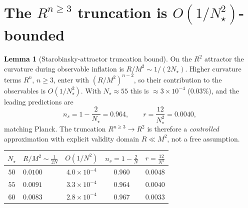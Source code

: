 \documentclass[11pt,a4paper]{article}
\theoremstyle{definition}
\newtheorem{lemma}{Lemma}
\begin{document}
\section{The $R^{n\ge3}$ truncation is $O(1/N_\star^2)$-bounded}
\begin{lemma}[Starobinsky-attractor truncation bound]
\label{lem:trunc}
On the $R^2$ attractor the curvature during observable inflation is $R/M^2\sim 1/(2N_\star)$. Higher
curvature terms $R^{n}$, $n\ge3$, enter with $(R/M^2)^{n-2}$, so their contribution to the observables is
$O(1/N_\star^2)$. With $N_\star\approx55$ this is $\approx3\times10^{-4}$ ($0.03\%$), and the leading
predictions are
\[
  n_s=1-\frac2{N_\star}=0.964,\qquad r=\frac{12}{N_\star^2}=0.0040 ,
\]
matching Planck. The truncation $R^{n\ge3}\!\to\!R^2$ is therefore a \emph{controlled} approximation with
explicit validity domain $R\ll M^2$, not a free assumption.
\end{lemma}

\begin{center}\small
\begin{tabularx}{0.8\linewidth}{@{}cYccc@{}}
\toprule
$N_\star$ & $R/M^2\sim\tfrac1{2N}$ & $O(1/N^2)$ & $n_s=1-\tfrac2N$ & $r=\tfrac{12}{N^2}$ \\
\midrule
$50$ & $0.0100$ & $4.0\times10^{-4}$ & $0.960$ & $0.0048$ \\
$55$ & $0.0091$ & $3.3\times10^{-4}$ & $0.964$ & $0.0040$ \\
$60$ & $0.0083$ & $2.8\times10^{-4}$ & $0.967$ & $0.0033$ \\
\bottomrule
\end{tabularx}
\end{center}
\end{document}
